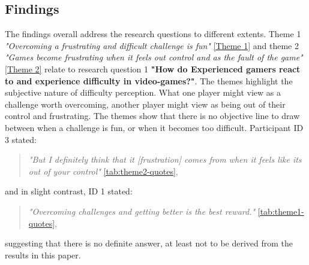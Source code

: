 \subsection{Findings}

The findings overall address the research questions to different extents. Theme 1 \textit{"Overcoming a frustrating and difficult challenge is fun"} \ref{Theme 1} and theme 2 \textit{"Games become frustrating when it feels out control and as the fault of the game"} \ref{Theme 2} relate to research question 1 \textbf{"How do Experienced gamers react to and experience difficulty in video-games?"}. The themes highlight the subjective nature of difficulty perception. What one player might view as a challenge worth overcoming, another player might view as being out of their control and frustrating. The themes show that there is no objective line to draw between when a challenge is fun, or when it becomes too difficult. Participant ID 3 stated: 
\begin{quote}
    \textit{"But I definitely think that it [frustration] comes from when it feels like its out of your control"} \ref{tab:theme2-quotes},
\end{quote}
and in slight contrast, ID 1 stated:
\begin{quote}
    \textit{"Overcoming challenges and getting better is the best reward."} \ref{tab:theme1-quotes},
\end{quote}
suggesting that there is no definite answer, at least not to be derived from the results in this paper. 

